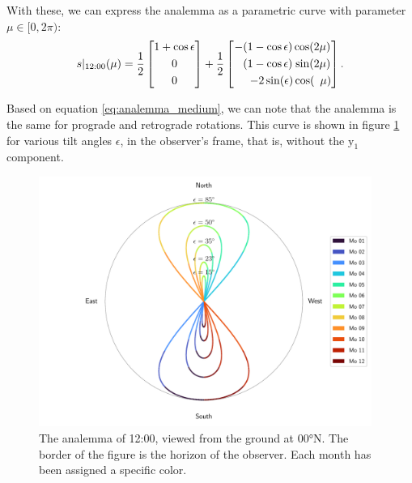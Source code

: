 \documentclass[12pt]{article}
\newcommand{\Sin}{%
  \mathop{\sbox0{$\cos$}\makebox[\wd0][r]{$\sin$}}%
}
\begin{document}
With these, we can express the analemma as a 
parametric curve with parameter 
$\mu \in [0,2\pi)$:
\begin{equation}
    s\vert_{12:00}(\mu) =
    \frac{1}{2}
    \begin{bmatrix}
        1+\cos\epsilon\\[3pt]
        0\\[3pt]
        0
    \end{bmatrix}+
    \frac{1}{2}
    \begin{bmatrix}
        - (1-\cos\epsilon) \cos(2\mu)\\[3pt]
        \phantom{-}(1-\cos\epsilon) \Sin(2\mu)\\[3pt]
        \quad\;\,-2\sin(\epsilon) \cos(\phantom{2}\mu)
    \end{bmatrix}.
    \label{eq:analemma_medium}
\end{equation}

Based on equation \eqref{eq:analemma_medium}, we can note that the analemma is 
the same for prograde and retrograde rotations. 
This curve is shown in figure \ref{fig:analemma_easy} for various 
tilt angles $\epsilon$, in the observer's frame, that is, without the 
$\mathrm{y}_1$ component. 

\begin{figure}[ht]
    \centering
    \includegraphics[width=0.97\textwidth]{./figures/analemma_plot.pdf}
    \caption{
        The analemma of 12:00, viewed from the ground at 00°N. 
        The border of the figure is the horizon of the observer. 
        Each month has been assigned a specific color.
    }
    \label{fig:analemma_easy}
\end{figure}
\end{document}

